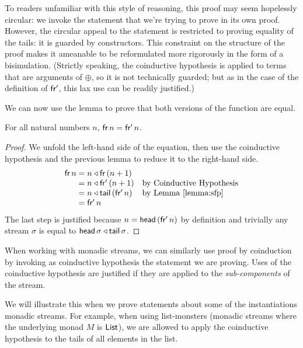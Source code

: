 To readers unfamiliar with this style of reasoning, this proof may seem hopelessly circular: we invoke the statement that we're trying to prove in its own proof.
However, the circular appeal to the statement is restricted to proving equality of the tails: it is guarded by constructors. 
This constraint on the structure of the proof makes it ameanable to be reformulated more rigorously in the form of a bisimulation.
(Strictly speaking, the coinductive hypothesis is applied to terms that are arguments of $\oplus$, so it is not technically guarded; but as in the case of the definition of $\mathsf{fr'}$, this lax use can be readily justified.)

We can now use the lemma to prove that both versions of the function are equal.
\begin{theorem}
For all natural numbers $n$, $\mathsf{fr}\,n = \mathsf{fr'}\,n$.
\end{theorem}
\begin{proof}
We unfold the left-hand side of the equation, then use the coinductive hypothesis and the previous lemma to reduce it to the right-hand side.
$$
\begin{array}{r@{{}={}}ll}
\sfr\,n
& n \scons \sfr\,(n+1)\\
& n \scons \sfp\,(n+1) & \mbox{by Coinductive Hypothesis}\\
& n \scons \tail\,(\sfp\,n) & \mbox{by Lemma \ref{lemma:sfp}}\\
& \sfp\,n
\end{array}
$$
The last step is justified because $n = \mathsf{head}\,(\mathsf{fr'}\,n)$ by definition and trivially any stream $\sigma$ is equal to $\mathsf{head}\,\sigma \triangleleft \mathsf{tail}\,\sigma$.
\end{proof}

When working with monadic streams, we can similarly use proof by coinduction by invoking as coinductive hypothesis the statement we are proving.
Uses of the coinductive hypothesis are justified if they are applied to the {\em sub-components} of the stream.

We will illustrate this when we prove statements about some of the instantiations monadic streams.
For example, when using list-monsters (monadic streams where the underlying monad $M$ is $\mathsf{List}$), we are allowed to apply the coinductive hypothesis to the tails of all elements in the list.

